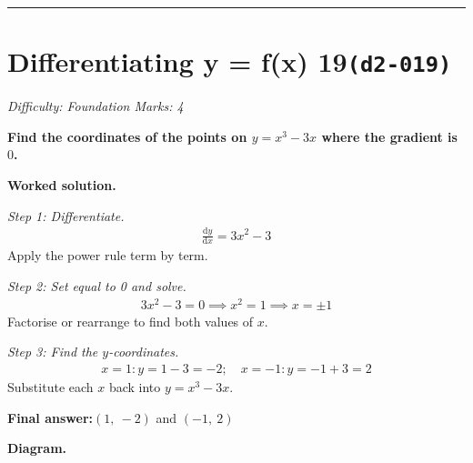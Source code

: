 \documentclass[11pt]{article}
\newcommand{\question}[1]{\par\medskip\noindent\textbf{#1}\par}
\begin{document}
\medskip\hrule

\section*{Differentiating y = f(x) 19\quad\small\texttt{(d2-019)}}
\textit{Difficulty: Foundation \quad\textbar\quad Marks: 4}

\question{Find the coordinates of the points on \( y = x^3 - 3x \) where the gradient is \( 0 \).}

\textbf{Worked solution.}

\textit{Step 1: Differentiate.}
\[\begin{gathered}
\frac{\mathrm{d}y}{\mathrm{d}x} = 3x^2 - 3
\end{gathered}\]
Apply the power rule term by term.

\textit{Step 2: Set equal to 0 and solve.}
\[\begin{gathered}
3x^2 - 3 = 0 \implies x^2 = 1 \implies x = \pm 1
\end{gathered}\]
Factorise or rearrange to find both values of \( x \).

\textit{Step 3: Find the \( y \)-coordinates.}
\[\begin{gathered}
x=1: y = 1 - 3 = -2; \quad x=-1: y = -1 + 3 = 2
\end{gathered}\]
Substitute each \( x \) back into \( y = x^3 - 3x \).

\begin{answerbox}
\textbf{Final answer:}\quad \(\displaystyle  (1,\ -2) \) and \(\displaystyle  (-1,\ 2) \)
\end{answerbox}
\textbf{Diagram.}
\end{document}

